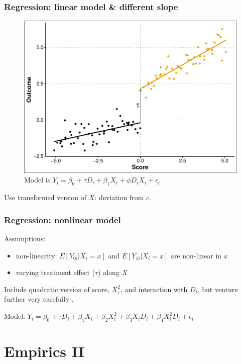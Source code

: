 \documentclass[12pt,english,dvipsnames,aspectratio=169,handout]{beamer}\usepackage[]{graphicx}\usepackage[]{xcolor}
\begin{document}
\begin{frame}
\frametitle{Regression: linear model \& different slope}



\begin{figure}
\centering
\includegraphics[scale=0.4]{../04-figures/07/10.pdf}
\caption{Model is $Y_i = \beta_0 + \tau D_i + \beta_1X_i + \phi D_iX_i + \epsilon_i$}
\end{figure}

Use transformed version of $X$: deviation from $c$.
\end{frame}


\begin{frame}
\frametitle{Regression: nonlinear model}
Assumptions:

\begin{itemize}
\item non-linearity: $E[Y_{0i} | X_i = x]$ and $E[Y_{1i} | X_i = x]$ are non-linear in $x$
\item varying treatment effect ($\tau$) along $X$
\end{itemize}\bigskip
\pause

Include quadratic version of score, $X_i^2$, and interaction with $D_i$, but venture further very carefully \cite{gelman_why_2019}.\bigskip
\pause

Model: $Y_i = \beta_0 + \tau D_i + \beta_1X_i + \beta_2X^2_i + \beta_3X_iD_i + \beta_4X^2_iD_i + \epsilon_i$

\end{frame}


\section{Empirics II}
\end{document}
